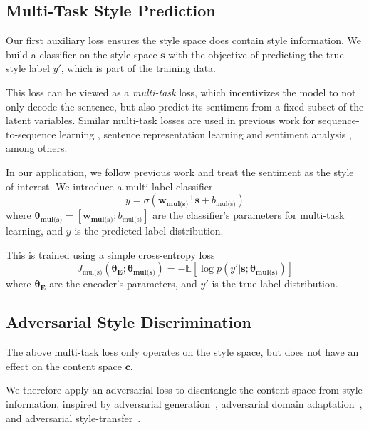 \documentclass[letterpaper]{article} %
\newcommand{\loss}[1]{J_{\text{#1}}}
\newcommand{\nnweight}[1]{\bm{\theta_{\text{#1}}}}
\newcommand{\weight}[1]{\bm{w_{\text{#1}}}}
\newcommand{\bias}[1]{b_{\text{#1}}}
\begin{document}
\subsection{Multi-Task Style Prediction} \label{ssec:multitask-style-objective}

Our first auxiliary loss ensures the style space does contain style information.
We build a classifier on the style space $\bm s$ with the objective of predicting the true style label $y'$, which is part of the training data.

This loss can be viewed as a \textit{multi-task} loss, which incentivizes the model to not only decode the sentence, but also predict its sentiment from a fixed subset of the latent variables.
Similar multi-task losses are used in previous work for sequence-to-sequence learning \cite{luong2015multi}, sentence representation learning \cite{jernite2017discourse} and sentiment analysis \cite{balikas2017multitask}, among others.

In our application, we follow previous work \cite{hu2017toward,shen2017style,fu2017style} and treat the sentiment as the style of interest.
We introduce a multi-label classifier
\begin{equation} \label{eqn:class-pred}
	y = \sigma({\weight{mul(s)}}^\top \bm s + \bias{mul(s)})
\end{equation}
where $\nnweight{mul(s)}=[\weight{mul(s)}; \bias{mul(s)}]$ are the classifier's parameters for multi-task learning, and $y$ is the predicted label distribution.

This is trained using a simple cross-entropy loss
\begin{equation} \label{eqn:style-multi-task-loss}
	\loss{mul(s)}(\nnweight{E};\nnweight{mul(s)}) =
	- \mathbb{E} [\log p(y' | \bm s; \nnweight{mul(s)})]
\end{equation}
where $\nnweight{E}$ are the encoder's parameters, and $y'$ is the true label distribution.


\subsection{Adversarial Style Discrimination} \label{ssec:adversarial-style-objective}

The above multi-task loss only operates on the style space, but does not have an effect on the content space $\bm c$.

We therefore apply an adversarial loss to disentangle the content space from style information, inspired by adversarial generation~\cite{goodfellow2014generative}, adversarial domain adaptation~\cite{liu2017adversarial}, and adversarial style-transfer~\cite{shen2017style}.
\end{document}
